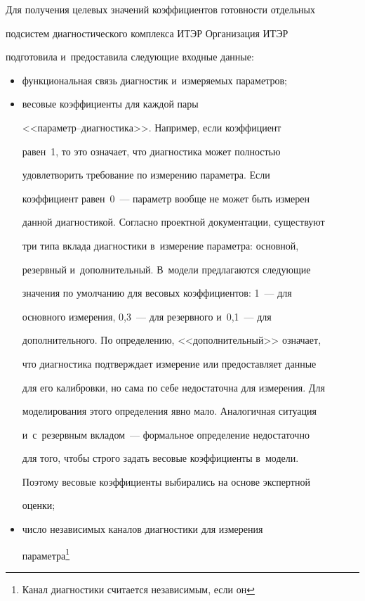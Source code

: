 Для получения целевых значений коэффициентов готовности отдельных 


подсистем диагностического комплекса ИТЭР Организация ИТЭР 


подготовила и~предоставила сле\-ду\-ющие входные данные:


\begin{itemize}


\item функциональная связь диагностик и~измеряемых параметров;


\item весовые коэффициенты для каждой пары  


<<па\-ра\-метр--диаг\-но\-сти\-ка>>. Например, если коэффициент 


равен~1, то это означает, что диагностика может полностью 


удовлетворить требование по измерению параметра. Если 


коэффициент равен~0~--- параметр вообще не может быть измерен 


данной диагностикой. Согласно проектной документации, существуют 


три типа вклада диагностики в~измерение па\-ра\-мет\-ра: основ\-ной, 


резервный и~дополнительный. В~модели предлагаются сле\-ду\-ющие 


значения по умолчанию для весовых коэффициентов: 1~--- для 


основного измерения, 0,3~--- для резервного и~0,1~--- для 


дополнительного. По определению, <<дополнительный>> означает, 


что диагностика под\-тверж\-да\-ет измерение или предоставляет данные 


для его калибровки, но сама по себе недостаточна для измерения. Для 


моделирования этого определения явно мало. Аналогичная ситуация 


и~с~резервным вкладом~--- формальное определение недостаточно 


для того, чтобы строго задать весовые коэффициенты в~модели. 


Поэтому весовые коэффициенты выбирались на основе экспертной 


оценки;


\item число независимых каналов диагностики для измерения 


параметра\footnote{Канал диагностики считается независимым, если он 


}
\end{itemize}
